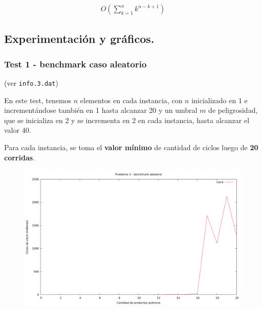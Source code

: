 \begin{align*}
  O(\sum_{k=1}^n k^{n - k + 1})
\end{align*}

\vspace*{0.75cm} \noindent


\newpage
\subsection{Experimentación y gráficos.}

\vspace*{0.3cm}

\subsubsection{Test 1 - benchmark caso aleatorio}

(ver \verb|info.3.dat|) \medskip

En este test, tenemos $n$ elementos en cada instancia, con $n$ inicializado en 1 e incrementándose
también en 1 hasta alcanzar 20 y un umbral $m$ de peligrosidad, que se inicializa en 2 y se incrementa
en 2 en cada instancia, hasta alcanzar el valor 40.

Para cada instancia, se toma el \textbf{valor mínimo} de cantidad de ciclos luego de \textbf{20 corridas}.

\vspace*{0.5cm}

\begin{figure}[h]
  \begin{center}
    \includegraphics[scale=0.35]{imagenes/grafico-3.png}
  \end{center}
\end{figure}

